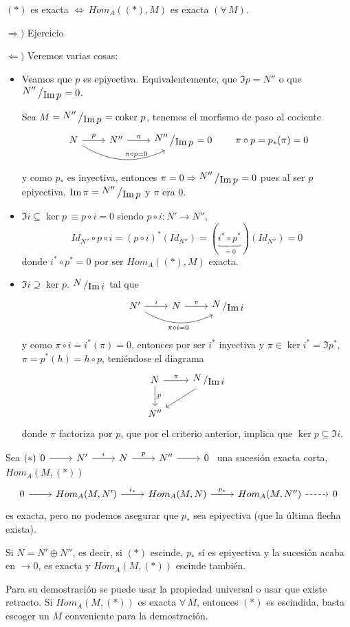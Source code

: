 \begin{prop}
     $(*)$ es exacta $\iff \, Hom_A((*),M)$ es exacta $(\forall \, M)$.
\end{prop}
\begin{dem}
    $\Rightarrow)$ Ejercicio

    $\Leftarrow)$ Veremos varias cosas: \begin{itemize} 
        \item Veamos que $p$ es epiyectiva. Equivalentemente, que $\Im p = N''$ o que $\modulo{N''}{\Im p} = 0$. 

        Sea $M = \modulo{N''}{\Im p} = \coker\, p$, tenemos el morfismo de paso al cociente
        $$\bt N \arrow[bend right = 10mm]{rr}{\pi \circ p =0} \arrow{r}{p} & N'' \arrow{r}{\pi} & \modulo{N''}{\Im p} = 0  \et \qquad \pi \circ p = p_*(\pi) = 0$$
        y como $p_*$ es inyectiva, entonces $\pi = 0 \Rightarrow \modulo{N''}{\Im p} = 0$ pues al ser $p$ epiyectiva, $\Im \pi = \modulo{N''}{\Im p}$ y $\pi$ era $0$. 
        \item $\Im i \subseteq \ker p \, \equiv p\circ i = 0 $ siendo $p\circ i: N' \longrightarrow N''$,
        $$Id_{N''}\circ p \circ i = (p\circ i)^* (Id_{N''}) = (\underbrace{i^* \circ p^*}_{=0})(Id_{N''}) = 0 $$
        donde $i^* \circ p^* = 0$ por ser $Hom_A((*),M)$ exacta. 
        \item $\Im i \supseteq \ker p$. $\modulo{N}{\Im i}$ tal que 
        $$\bt N' \arrow{r}{i} \arrow[bend right=10mm,swap]{rr}{\pi \circ i=0}& N \arrow{r}{\pi} & \modulo{N}{\Im i} \et$$
        y como $\pi \circ i = i^*(\pi) = 0$, entonces por ser $i^*$ inyectiva y $\pi \in \ker  i^* = \Im p^*$, $\pi = p^*(h) = h \circ p$, teni\'endose el diagrama
        $$\bt N \arrow{r}{\pi} \arrow{d}{p} & \modulo{N}{\Im i} \arrow{dl} \\ N'' \et$$
        donde $\pi$ factoriza por $p$, que por el criterio anterior, implica que $\ker p \subseteq \Im i$.        
    \end{itemize}
\end{dem}
\begin{ejem}
    Sea $(*) \bt 0 \arrow{r} & N' \arrow{r}{i} & N \arrow{r}{p} & N'' \arrow{r} & 0 \et$ una sucesi\'on exacta corta, $Hom_A(M,(*))$
    $$ \bt 0 \arrow{r} & Hom_A( M,N') \arrow{r}{i_*} & Hom_A(M,N) \arrow{r}{p_*} & Hom_A(M,N'') \arrow[dashed]{r} & 0 \et$$
    es exacta, pero no podemos asegurar que $p_*$ sea epiyectiva (que la \'ultima flecha exista).
\end{ejem}
\begin{prop}
    Si $N = N' \oplus N''$, es decir, si $(*)$ escinde, $p_*$ s\'i es epiyectiva y la sucesi\'on acaba en $\longrightarrow 0$, es exacta y $Hom_A(M,(*))$ escinde tambi\'en.
\end{prop}
\begin{dem}
    Para su demostraci\'on se puede usar la propiedad universal o usar que existe retracto. Si $Hom_A(M,(*))$ es exacta $\forall \, M$, entonces $(*)$ es escindida, basta escoger un $M$ conveniente para la demostraci\'on.
\end{dem}

